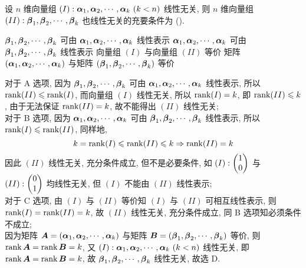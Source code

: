 \begin{example}
    设 $n$ 维向量组 $(I):\vb*{\alpha}_1,\vb*{\alpha}_2,\cdots,\vb*{\alpha}_k~ (k<n)$ 线性无关, 则 $n$ 维向量组 $(II):\vb*{\beta}_1,\vb*{\beta}_2,\cdots,\vb*{\beta}_k$ 也线性无关的充要条件为 (\quad).
    \begin{tasks}
        \task $\vb*{\beta}_1,\vb*{\beta}_2,\cdots,\vb*{\beta}_k$ 可由 $\vb*{\alpha}_1,\vb*{\alpha}_2,\cdots,\vb*{\alpha}_k$ 线性表示
        \task $\vb*{\alpha}_1,\vb*{\alpha}_2,\cdots,\vb*{\alpha}_k$ 可由 $\vb*{\beta}_1,\vb*{\beta}_2,\cdots,\vb*{\beta}_k$ 线性表示
        \task 向量组 $(I)$ 与向量组 $(II)$ 等价
        \task 矩阵 $(\vb*{\alpha}_1,\vb*{\alpha}_2,\cdots,\vb*{\alpha}_k)$ 与矩阵 $(\vb*{\beta}_1,\vb*{\beta}_2,\cdots,\vb*{\beta}_k)$ 等价
    \end{tasks}
\end{example}
\begin{solution}
    对于 A 选项, 因为 $\vb*{\beta}_1,\vb*{\beta}_2,\cdots,\vb*{\beta}_k$ 可由 $\vb*{\alpha}_1,\vb*{\alpha}_2,\cdots,\vb*{\alpha}_k$ 线性表示, 所以 $\rank(II)\leqslant \rank(I)$, 而向量组 $(I)$ 线性无关,
    所以 $\rank(I)=k$, 即 $\rank(II)\leqslant k$, 由于无法保证 $\rank(II)=k$, 故不能得出 $(II)$ 线性无关;\\
    对于 B 选项, 因为 $\vb*{\alpha}_1,\vb*{\alpha}_2,\cdots,\vb*{\alpha}_k$ 可由 $\vb*{\beta}_1,\vb*{\beta}_2,\cdots,\vb*{\beta}_k$ 线性表示, 所以 $\rank(I)\leqslant \rank(II)$, 同样地,
    $$k=\rank(I)\leqslant\rank(II)\leqslant k\Rightarrow \rank(II)=k$$
    因此 $(II)$ 线性无关, 充分条件成立, 但不是必要条件, 如 $(I):\mqty(1\\0)$ 与 $(II):\mqty(0\\1)$ 均线性无关, 但 $(I)$ 不能由 $(II)$ 线性表示;\\
    对于 C 选项, 由 $(I)$ 与 $(II)$ 等价知 $(I)$ 与 $(II)$ 可相互线性表示, 则 $\rank(I)=\rank(II)=k$, 故 $(II)$ 线性无关, 充分条件成立, 同 B 选项知必须条件不成立;\\
    因为矩阵 $\vb*{A}=(\vb*{\alpha}_1,\vb*{\alpha}_2,\cdots,\vb*{\alpha}_k)$ 与矩阵 $\vb*{B}=(\vb*{\beta}_1,\vb*{\beta}_2,\cdots,\vb*{\beta}_k)$ 等价, 则 $\rank\vb*{A}=\rank\vb*{B}=k$,
    又 $(I):\vb*{\alpha}_1,\vb*{\alpha}_2,\cdots,\vb*{\alpha}_k~ (k<n)$ 线性无关, 即 $\rank\vb*{A}=\rank\vb*{B}=k$, 故 $\vb*{\beta}_1,\vb*{\beta}_2,\cdots,\vb*{\beta}_k$ 线性无关, 故选 D.
\end{solution}

